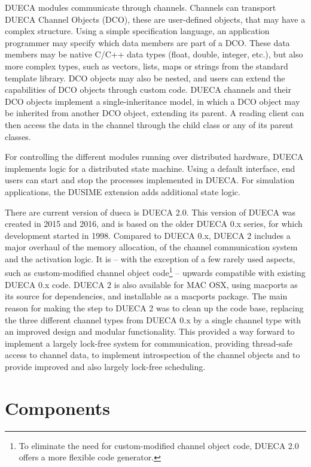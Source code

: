 \documentclass[11pt,a4paper,twoside]{scrartcl}
\begin{document}
DUECA modules communicate through channels. Channels can transport DUECA Channel Objects (DCO), these are user-defined objects, that may have a complex structure. Using a simple specification language, an application programmer may specify which data members are part of a DCO. These data members may be native C/C++ data types (float, double, integer, etc.), but also more complex types, such as vectors, lists, maps or strings from the standard template library. DCO objects may also be nested, and users can extend the capabilities of DCO objects through custom code. DUECA channels and their DCO objects implement a single-inheritance model, in which a DCO object may be inherited from another DCO object, extending its parent. A reading client can then access the data in the channel through the child class or any of its parent classes.

For controlling the different modules running over distributed hardware, DUECA implements logic for a distributed state machine. Using a default interface, end users can start and stop the processes implemented in DUECA. For simulation applications, the DUSIME extension adds additional state logic.

There are current version of dueca is DUECA 2.0. This version of DUECA was created in 2015 and 2016, and is based on the older DUECA 0.x series, for which development started in 1998. Compared to DUECA 0.x, DUECA 2 includes a major overhaul of the memory allocation, of the channel communication system and the activation logic. It is -- with the exception of a few rarely used aspects, such as custom-modified channel object code\footnote{To eliminate the need for custom-modified channel object code, DUECA 2.0 offers a more flexible code generator.} -- upwards compatible with existing DUECA 0.x code. DUECA 2 is also available for MAC OSX, using macports as its source for dependencies, and installable as a macports package. The main reason for making the step to DUECA 2 was to clean up the code base, replacing the three different channel types from DUECA 0.x by a single channel type with an improved design and modular functionality. This provided a way forward to implement a largely lock-free system for communication, providing thread-safe access to channel data, to implement introspection of the channel objects and to provide improved and also largely lock-free scheduling.

\section{Components}
\end{document}
